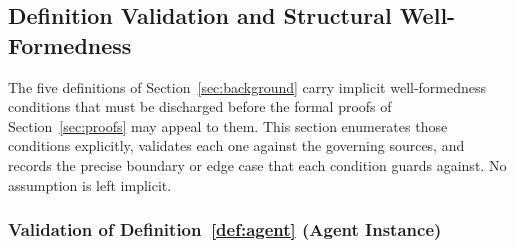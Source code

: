 \documentclass[12pt]{article}
\theoremstyle{definition}
\begin{document}
\subsection{Definition Validation and Structural Well-Formedness}
\label{sec:def-validation}

The five definitions of Section~\ref{sec:background} carry implicit
well-formedness conditions that must be discharged before the formal
proofs of Section~\ref{sec:proofs} may appeal to them.
This section enumerates those conditions explicitly,
validates each one against the governing sources, and records the
precise boundary or edge case that each condition guards against.
No assumption is left implicit.

\subsubsection{Validation of Definition~\ref{def:agent} (Agent Instance)}
\label{sec:val-agent}
\end{document}
